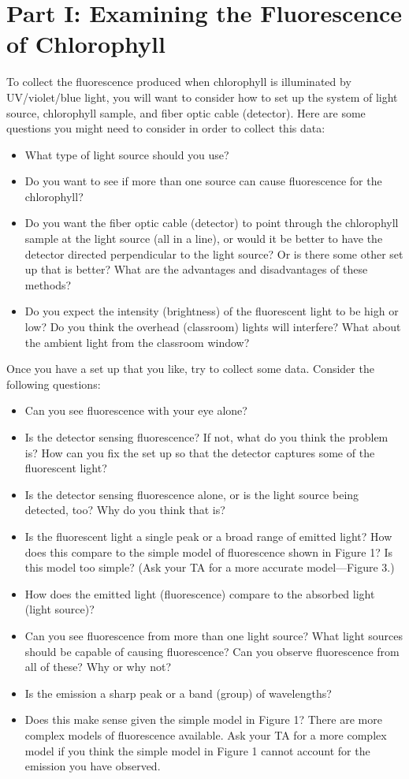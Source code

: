 \section*{Part I: Examining the Fluorescence of Chlorophyll}
To collect the fluorescence produced when chlorophyll is illuminated by UV/violet/blue
light, you will want to consider how to set up the system of light source, chlorophyll sample, and
fiber optic cable (detector). Here are some questions you might need to consider in order to collect
this data:
\begin{itemize}
\itemsep-0.3em
\item What type of light source should you use?
\item Do you want to see if more than one source can cause fluorescence for the chlorophyll?
\item Do you want the fiber optic cable (detector) to point through the chlorophyll sample at the light source (all in a line), or would it be better to have the detector directed perpendicular to the light source? Or is there some other set up that is better? What are the advantages and disadvantages of these methods?
\item Do you expect the intensity (brightness) of the fluorescent light to be high or low? Do you think the overhead (classroom) lights will interfere? What about the ambient light from the classroom window?
\end{itemize}
Once you have a set up that you like, try to collect some data. Consider the following questions:
\begin{itemize}
\itemsep-0.3em
\item Can you see fluorescence with your eye alone?
\item Is the detector sensing fluorescence? If not, what do you think the problem is? How can you fix the set up so that the detector captures some of the fluorescent light?
\item Is the detector sensing fluorescence alone, or is the light source being detected, too? Why do you think that is?
\item Is the fluorescent light a single peak or a broad range of emitted light? How does this compare to the simple model of fluorescence shown in Figure 1? Is this model too simple? (Ask your TA for a more accurate model—Figure 3.)
\item How does the emitted light (fluorescence) compare to the absorbed light (light source)?
\item Can you see fluorescence from more than one light source? What light sources should be capable of causing fluorescence? Can you observe fluorescence from all of these? Why or why not?
\item Is the emission a sharp peak or a band (group) of wavelengths?
\item Does this make sense given the simple model in Figure 1? There are more complex models of fluorescence available. Ask your TA for a more complex model if you think the simple model in Figure 1 cannot account for the emission you have observed.
\end{itemize}

